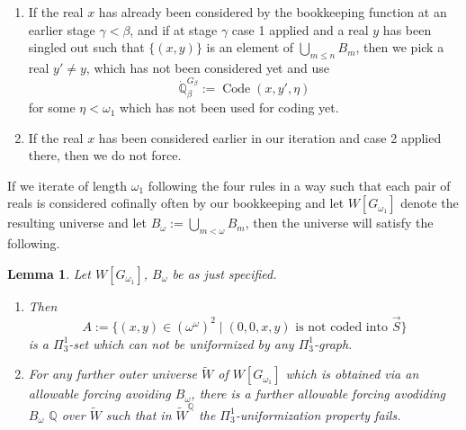 \documentclass[a4paper,11pt]{article}
\newtheorem{lemma}[theorem]{Lemma}
\newcommand{\forceQ}{\mathbb{Q}}
\begin{document}
\begin{enumerate}
    \item If the real $x$ has already been considered by the bookkeeping function at an earlier stage $\gamma < \beta$, and if at stage $\gamma$ case 1 applied and a real $y$ has been singled out such that $\{(x,y)\}$ is an element of $\bigcup_{m \le n} B_m$, then we pick a real $y' \ne y$, which has not been considered yet and use
    \[ \dot{\forceQ}_{\beta}^{G_{\beta}} := \operatorname{Code} (x,y',\eta)\]
    for some $\eta < \omega_1$ which has not been used for coding yet.
    \item If the real $x$ has been considered earlier in our iteration and case 2 applied there, then we do not force. 
      \end{enumerate}

If we iterate of length $\omega_1$ following the four rules in a way such that each pair of reals is considered cofinally often by our bookkeeping and let $W[G_{\omega_1}]$ denote the resulting universe and let $B_{\omega}:= \bigcup_{m < \omega} B_m$, then the universe will satisfy the following.
\begin{lemma}
    Let $W[G_{\omega_1}]$, $B_{\omega}$ be as just specified. 
    \begin{enumerate}
        \item  Then \[ A:= \{ (x,y) \in (\omega^{\omega})^2 \mid (0,0,x,y) \text{ is not coded into $\vec{S}$} \}\] is a $\Pi^1_3$-set which can not be uniformized by any $\Pi^1_3$-graph.
        \item For any further outer universe $\tilde{W}$ of $W[G_{\omega_1}]$ which is obtained via an allowable forcing avoiding $B_{\omega}$, there is a further allowable forcing avodiding $B_{\omega}$ $\forceQ$ over $\tilde{W}$ such that in $\tilde{W}^{\forceQ}$ the $\Pi^1_3$-uniformization property fails.
    \end{enumerate}
    
   
\end{lemma}\label{PropertiesOfIntermediateModel}
\end{document}
